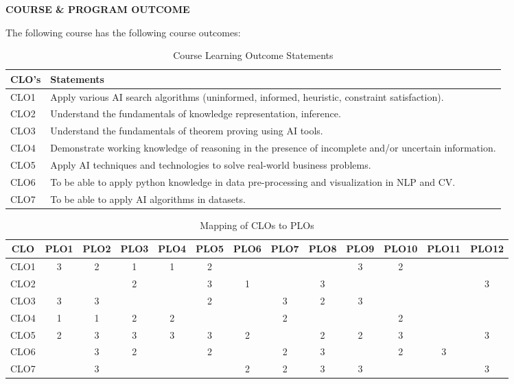 \vspace*{1.5cm}
\setlength{\headheight}{14pt}
\begin{center}
	{\LARGE \bf COURSE \& PROGRAM OUTCOME}\\
\vspace*{1.5cm}
\begin{flushleft}
The following course has the following course outcomes:
\end{flushleft}

\begin{table}[h!]
\centering
\caption{Course Learning Outcome Statements}
\vspace{0.1cm}
\begin{tabular}{|p{}|p{}|}
\hline
\textbf{CLO's} & \textbf{Statements} \\
\hline
CLO1 & Apply various AI search algorithms (uninformed, informed, heuristic, constraint satisfaction). \\
\hline
CLO2 & Understand the fundamentals of knowledge representation, inference. \\
\hline
CLO3 & Understand the fundamentals of theorem proving using AI tools. \\
\hline
CLO4 & Demonstrate working knowledge of reasoning in the presence of incomplete and/or uncertain information. \\
\hline
CLO5 & Apply AI techniques and technologies to solve real-world business problems. \\
\hline
CLO6 & To be able to apply python knowledge in data pre-processing and visualization in NLP and CV. \\
\hline
CLO7 & To be able to apply AI algorithms in datasets. \\
\hline
\end{tabular}
\end{table}

\vspace{1cm}

\begin{table}[h!]
\centering
\caption{Mapping of CLOs to PLOs}
\begin{tabular}{|c|c|c|c|c|c|c|c|c|c|c|c|c|}
\hline
\textbf{CLO} & PLO1 & PLO2 & PLO3 & PLO4 & PLO5 & PLO6 & PLO7 & PLO8 & PLO9 & PLO10 & PLO11 & PLO12 \\
\hline
CLO1 & 3 & 2 & 1 & 1 & 2 &  &  &  & 3 & 2 &  &  \\
\hline
CLO2  &  &  & 2 &  & 3 & 1 &  & 3 &  &  &  & 3 \\
\hline
CLO3 & 3 & 3 &  &  & 2 &  & 3 & 2 & 3 &  &  &  \\
\hline
CLO4 & 1 & 1 & 2 & 2 &  &  & 2 &  &  & 2 &  &  \\
\hline
CLO5 & 2 & 3 & 3 & 3 & 3 & 2 &  & 2 & 2 & 3 &  & 3 \\
\hline
CLO6 &  & 3 & 2 &  & 2 &  & 2 & 3 &  & 2 & 3 &  \\
\hline
CLO7 &  & 3 &  &  &  & 2 & 2 & 3 & 3 &  &  & 3 \\
\hline
\end{tabular}
\end{table}


\end{center}
